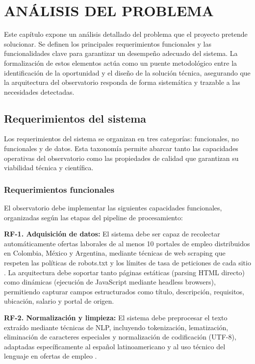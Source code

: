 \chapter{ANÁLISIS DEL PROBLEMA}

Este capítulo expone un análisis detallado del problema que el proyecto pretende solucionar. Se definen los principales requerimientos funcionales y las funcionalidades clave para garantizar un desempeño adecuado del sistema. La formalización de estos elementos actúa como un puente metodológico entre la identificación de la oportunidad y el diseño de la solución técnica, asegurando que la arquitectura del observatorio responda de forma sistemática y trazable a las necesidades detectadas.

\section{Requerimientos del sistema}

Los requerimientos del sistema se organizan en tres categorías: funcionales, no funcionales y de datos. Esta taxonomía permite abarcar tanto las capacidades operativas del observatorio como las propiedades de calidad que garantizan su viabilidad técnica y científica.

\subsection{Requerimientos funcionales}

El observatorio debe implementar las siguientes capacidades funcionales, organizadas según las etapas del pipeline de procesamiento:

\textbf{RF-1. Adquisición de datos:} El sistema debe ser capaz de recolectar automáticamente ofertas laborales de al menos 10 portales de empleo distribuidos en Colombia, México y Argentina, mediante técnicas de web scraping que respeten las políticas de robots.txt y los límites de tasa de peticiones de cada sitio \cite{orozco2019webscraping}. La arquitectura debe soportar tanto páginas estáticas (parsing HTML directo) como dinámicas (ejecución de JavaScript mediante headless browsers), permitiendo capturar campos estructurados como título, descripción, requisitos, ubicación, salario y portal de origen.

\textbf{RF-2. Normalización y limpieza:} El sistema debe preprocesar el texto extraído mediante técnicas de NLP, incluyendo tokenización, lematización, eliminación de caracteres especiales y normalización de codificación (UTF-8), adaptadas específicamente al español latinoamericano y al uso técnico del lenguaje en ofertas de empleo \cite{echeverria2022}.

